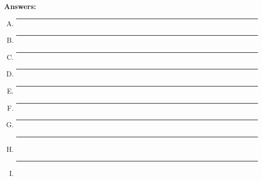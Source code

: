 \documentclass[10pt]{article}
\begin{document}
\textbf{Answers:}\\
\begin{enumerate}[A.]
\item \rule{1cm}{.5pt}
\vspace{0.2cm}
\item \rule{1cm}{.5pt}
\vspace{0.2cm}
\item \rule{1cm}{.5pt}
\vspace{0.2cm}
\item \rule{1cm}{.5pt}
\vspace{0.2cm}
\item \rule{1cm}{.5pt}
\vspace{0.2cm}
\item \rule{1cm}{.5pt}
\vspace{0.2cm}
\item \rule{1cm}{.5pt}
\vspace{0.2cm}
\item \rule{1cm}{.5pt}
\vspace{0.2cm}\\
\item \rule{1cm}{.5pt}
\vspace{0.2cm}\\
\end{enumerate}
\end{document}
